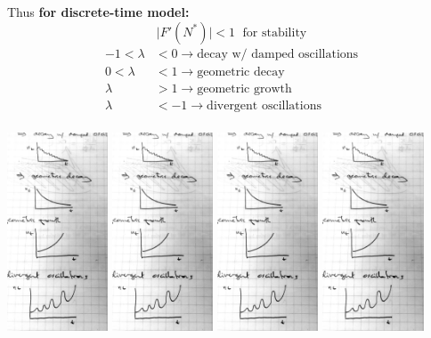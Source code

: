 \documentclass{article}
\begin{document}
Thus \textbf{for discrete-time model:}\\
\begin{equation*}
\boxed{\vert F'(N^*)\vert < 1 \; \text{ for stability}}
\end{equation*}
\begin{align*}
-1<\lambda &< 0 \to \text{decay w/ damped oscillations}\\
 0<\lambda &< 1 \to \text{geometric decay}\\
 \lambda &> 1 \to \text{geometric growth}\\
 \lambda &<-1 \to \text{divergent oscillations}\\
\end{align*}
\begin{center}
\includegraphics[width=3cm]{figs/DecayOscil.pdf}
\includegraphics[width=3cm]{figs/Decay.pdf}
\includegraphics[width=3cm]{figs/Growth.pdf}
\includegraphics[width=3cm]{figs/GrowthOscil.pdf}
\end{center}
\end{document}
